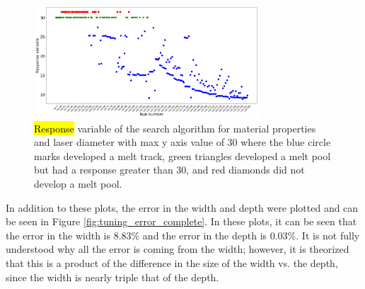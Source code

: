 \documentclass[metals,article,accept,pdftex,moreauthors]{Definitions/mdpi}
\begin{document}
\begin{figure}[H]
\includegraphics[width=0.75\textwidth]{response_zoomed}
\caption{\hl{Response} %
 variable of the search algorithm for material properties and laser diameter with max y axis value of 30 where the blue circle marks developed a melt track, green triangles developed a melt pool but had a response greater than 30, and red diamonds did not develop a melt pool.}
\label{fig:response_zoomed}
\end{figure}

In addition to these plots, the error in the width and depth were plotted and can be seen in 
Figure \ref{fig:tuning_error_complete}.  In these plots, it can be seen that the error in the 
width is 8.83\% and the error in the depth is 0.03\%.  It is not fully understood why all the 
error is coming from the width; however, it is theorized that this is a product of the 
difference in the size of the width vs. the depth, since the width is nearly triple that of the 
depth.
\end{document}
